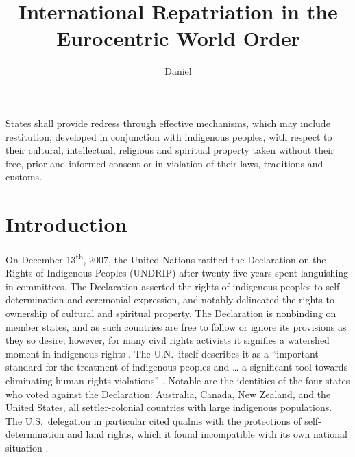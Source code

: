 \documentclass[american]{../../../coursework}
\title{International Repatriation in the Eurocentric World Order}
\subtitle{}
\author{Daniel}{Glenn}{Leonard}
\date{\displaydate{date}}
\begin{document}
\setcounter{page}{43}
\maketitle

\epigraph{States shall provide redress through effective
    mechanisms, which may include restitution, developed in conjunction with
    indigenous peoples, with respect to their cultural, intellectual,
    religious and spiritual property taken without their free, prior and
    informed consent or in violation of their laws, traditions and customs.}
    {\textcite[Article 11, Section 2]{Uni07}}

\section{Introduction}

On December 13\textsuperscript{th}, 2007, the United Nations ratified the
Declaration on the Rights of Indigenous Peoples (UNDRIP) after twenty-five
years spent languishing in committees. The Declaration asserted the rights of
indigenous peoples to self-determination and ceremonial expression, and
notably delineated the rights to ownership of cultural and spiritual property.
The Declaration is nonbinding on member states, and as such countries are free
to follow or ignore its provisions as they so desire; however, for many civil
rights activists it signifies a watershed moment in indigenous rights
\parencite{Wei12}. The U.N.\ itself describes it as a ``important standard for
the treatment of indigenous peoples and … a significant tool towards
eliminating human rights violations'' \parencite[2]{UniFAQ}. Notable are the
identities of the four states who voted against the Declaration: Australia,
Canada, New Zealand, and the United States, all settler-colonial countries
with large indigenous populations. The U.S.\ delegation in particular cited
qualms with the protections of self-determination and land rights, which it
found incompatible with its own national situation \parencite{Uni071}.
\end{document}
